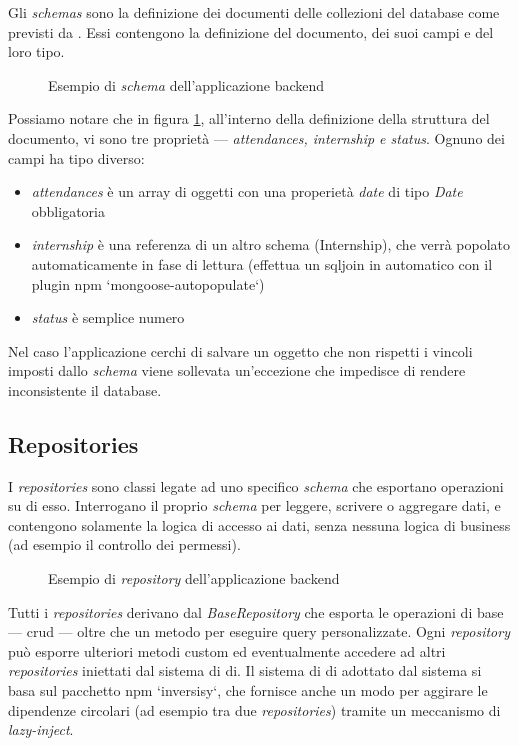 Gli \textit{schemas} sono la definizione dei documenti delle collezioni del database come previsti da \mongoosejs. Essi contengono la definizione del documento, dei suoi campi e del loro tipo.
\begin{figure}[!h] 
	\centering    
	
	\caption[Esempio di \textit{schema} dell'applicazione \gls{backend}]{Esempio di \textit{schema} dell'applicazione \gls{backend}}
	\label{fig:server-schema}
\end{figure}
Possiamo notare che in figura \ref{fig:server-schema}, all'interno della definizione della struttura del documento, vi sono tre proprietà --- \textit{attendances, internship e status}. Ognuno dei campi ha tipo diverso:
\begin{itemize}
	\item \textit{attendances} è un array di oggetti con una properietà \textit{date} di tipo \textit{Date} obbligatoria
	\item \textit{internship} è una referenza di un altro schema (Internship), che verrà popolato automaticamente in fase di lettura (effettua un \gls{sqljoin} in automatico con il plugin \acrshort{npm} `mongoose-autopopulate`)
	\item \textit{status} è semplice numero
\end{itemize}
Nel caso l'applicazione cerchi di salvare un oggetto che non rispetti i vincoli imposti dallo \textit{schema} viene sollevata un'eccezione che impedisce di rendere inconsistente il database.

\subsection{Repositories}
I \textit{repositories} sono classi legate ad uno specifico \textit{schema} che esportano operazioni su di esso. Interrogano il proprio \textit{schema} per leggere, scrivere o aggregare dati, e contengono solamente la logica di accesso ai dati, senza nessuna logica di business (ad esempio il controllo dei permessi).
\begin{figure}[!h] 
	\centering    
	
	\caption[Esempio di \textit{Repository}]{Esempio di \textit{repository} dell'applicazione \gls{backend}}
	\label{fig:server-repository}
\end{figure}
Tutti i \textit{repositories} derivano dal \textit{BaseRepository} che esporta le operazioni di base --- \gls{crud} --- oltre che un metodo per eseguire query personalizzate.
Ogni \textit{repository} può esporre ulteriori metodi custom ed eventualmente accedere ad altri \textit{repositories} iniettati dal sistema di \acrfull{di}. Il sistema di \acrshort{di} adottato dal sistema si basa sul pacchetto \acrshort{npm} `inversisy`, che fornisce anche un modo per aggirare le dipendenze circolari (ad esempio tra due \textit{repositories}) tramite un meccanismo di \textit{lazy-inject}.

